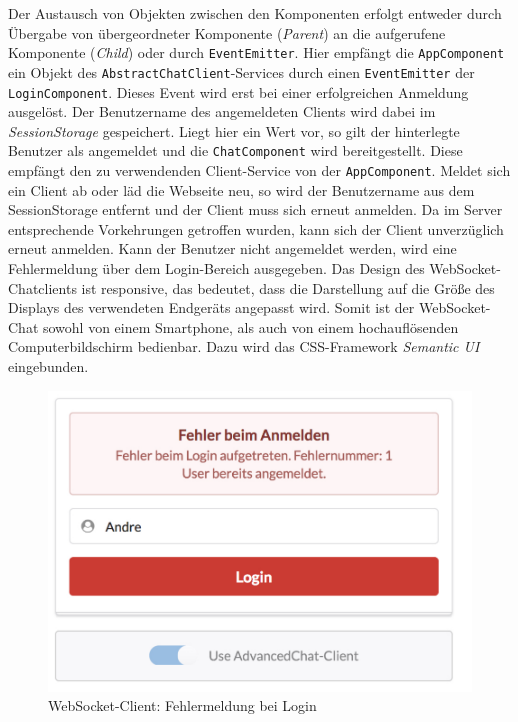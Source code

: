 \documentclass[11pt,a4paper,titlepage]{scrartcl}
\numberwithin{equation}{section}
\begin{document}
\noindent Der Austausch von Objekten zwischen den Komponenten erfolgt entweder durch Übergabe von übergeordneter Komponente (\textit{Parent}) an die aufgerufene Komponente (\textit{Child}) oder durch \texttt{EventEmitter}. Hier empfängt die \texttt{AppComponent} ein Objekt des \texttt{AbstractChatClient}-Services durch einen \texttt{EventEmitter} der \texttt{LoginComponent}. Dieses Event wird erst bei einer erfolgreichen Anmeldung ausgelöst. Der Benutzername des angemeldeten Clients wird dabei im \textit{SessionStorage} gespeichert. Liegt hier ein Wert vor, so gilt der hinterlegte Benutzer als angemeldet und die \texttt{ChatComponent} wird bereitgestellt. Diese empfängt den zu verwendenden Client-Service von der \texttt{AppComponent}. Meldet sich ein Client ab oder läd die Webseite neu, so wird der Benutzername aus dem SessionStorage entfernt und der Client muss sich erneut anmelden. Da im Server entsprechende Vorkehrungen getroffen wurden, kann sich der Client unverzüglich erneut anmelden. Kann der Benutzer nicht angemeldet werden, wird eine Fehlermeldung über dem Login-Bereich ausgegeben. Das Design des WebSocket-Chatclients ist responsive, das bedeutet, dass die Darstellung auf die Größe des Displays des verwendeten Endgeräts angepasst wird. Somit ist der WebSocket-Chat sowohl von einem Smartphone, als auch von einem hochauflösenden Computerbildschirm bedienbar. Dazu wird das CSS-Framework \textit{Semantic UI} eingebunden.
\medskip
\begin{figure}[ht] 
	\begin{center}
		\includegraphics[scale=0.44]{img/LoginErrorView.pdf}
		\caption{WebSocket-Client: Fehlermeldung bei Login}
		\label{fig:errorLoginView}
	\end{center}
\end{figure}
\end{document}
